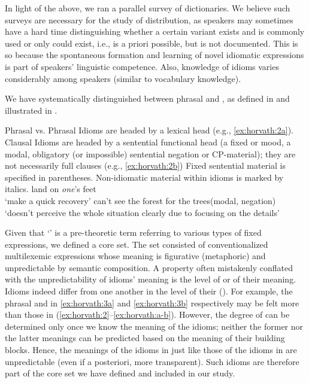 \documentclass[output=paper,
modfonts
]{LSP/langsci}
\begin{document}
In light of the above, we ran a parallel survey of  
dictionaries. We believe such surveys are necessary for the study of
 distribution, as speakers may sometimes have a hard time
distinguishing whether a certain  variant exists and is commonly
used or only could exist, i.e., is a priori possible, but is not
documented. This is so because the spontaneous formation and learning of
novel idiomatic expressions is part of speakers' linguistic competence.
Also, knowledge of idioms varies considerably among speakers (similar to
vocabulary knowledge).

We have systematically distinguished between phrasal and ,
as defined in  and illustrated in .

\ea \label{ex:horvath:1} Phrasal vs. 
	\ea \label{ex:horvath:1a} Phrasal Idioms are headed by a lexical head (e.g., \ref{ex:horvath:2a}).
	\ex \label{ex:horvath:1b} Clausal Idioms are headed by a sentential functional head (a fixed
	 or mood, a modal, obligatory (or impossible) sentential negation
	or CP-material); they are not necessarily full clauses (e.g., \ref{ex:horvath:2b})
	\z
\z
Fixed sentential material is specified in parentheses. Non-idiomatic material within idioms is marked by italics.
\ea \label{ex:horvath:2}
	\ea \label{ex:horvath:2a} land on \emph{one}'s feet\\
	`make a quick recovery'
	\ex \label{ex:horvath:2b} can't see the forest for the trees\hfill (modal, negation)\\
	 `doesn't perceive the whole situation clearly due to focusing on the details'
	\z
\z

Given that `' is a pre-theoretic term referring to various types of
fixed expressions, we defined a core set. The set consisted of
conventionalized multilexemic expressions whose meaning is figurative
(metaphoric) and unpredictable by semantic composition. A property often
mistakenly conflated with the unpredictability of idioms' meaning is the
level of  or  of their meaning. Idioms indeed differ
from one another in the level of their  (). For
example, the phrasal and  in \ref{ex:horvath:3a} and \ref{ex:horvath:3b} respectively
may be felt more  than those in (\ref{ex:horvath:2}--\ref{ex:horvath:a-b}). However, the degree of
 can be determined only once we know the meaning of the idioms;
neither the former nor the latter meanings can be predicted based on the
meaning of their building blocks. Hence, the meanings of the idioms in
 just like those of the idioms in  are unpredictable (even if a
posteriori, more transparent). Such idioms are therefore part of the
core set we have defined and included in our study.
\end{document}
